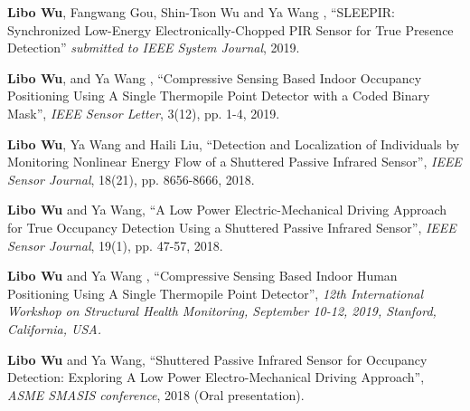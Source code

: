

\begin{cvparagraph}

    \vspace{12pt}
    \begin{cvitems}
    \setlength{\itemsep}{2pt}
    \item{
        \textbf{Libo Wu}{, Fangwang Gou, Shin-Tson Wu and Ya Wang , ``SLEEPIR: Synchronized Low-Energy Electronically-Chopped PIR Sensor for True Presence Detection'' \textit{submitted to IEEE System Journal}, 2019.}}
        
        \item{
        \textbf{Libo Wu}{, and Ya Wang , ``Compressive Sensing Based Indoor Occupancy Positioning Using A Single Thermopile Point Detector with a Coded Binary Mask'', \textit{IEEE Sensor Letter}, 3(12), pp. 1-4, 2019.}}
  
      \item{
        \textbf{Libo Wu}{, Ya Wang and Haili Liu, ``Detection and Localization of Individuals by Monitoring Nonlinear Energy Flow of a Shuttered Passive Infrared Sensor'', \textit{IEEE Sensor Journal}, 18(21), pp. 8656-8666, 2018.}}
  
        \item{
        \textbf{Libo Wu}{ and Ya Wang, ``A Low Power Electric-Mechanical Driving Approach for True Occupancy Detection Using a Shuttered Passive Infrared Sensor'', \textit{IEEE Sensor Journal}, 19(1), pp. 47-57, 2018.}}
    \end{cvitems}
    \vspace{12pt}


\vspace{12pt}
\begin{cvitems}
    \setlength{\itemsep}{2pt}
    \item{
        \textbf{Libo Wu}{ and Ya Wang , ``Compressive Sensing Based Indoor Human Positioning Using A Single Thermopile Point Detector'', \textit{12th International Workshop on Structural Health Monitoring, September 10-12, 2019, Stanford, California, USA.}}}
      
      \item{
        \textbf{Libo Wu}{ and Ya Wang, ``Shuttered Passive Infrared Sensor for Occupancy Detection: Exploring A Low Power Electro-Mechanical Driving Approach'', \textit{ASME SMASIS conference}, 2018 (Oral presentation).}}    
      \end{cvitems}
      \vspace{8pt}

    
\end{cvparagraph}
